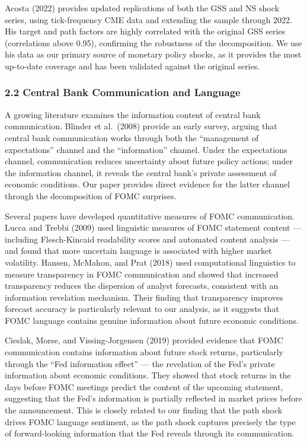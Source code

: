 \documentclass[
]{article}
\begin{document}
Acosta (2022) provides updated replications of both the GSS and NS shock
series, using tick-frequency CME data and extending the sample through
2022. His target and path factors are highly correlated with the
original GSS series (correlations above 0.95), confirming the robustness
of the decomposition. We use his data as our primary source of monetary
policy shocks, as it provides the most up-to-date coverage and has been
validated against the original series.

\subsubsection{2.2 Central Bank Communication and
Language}\label{central-bank-communication-and-language}

A growing literature examines the information content of central bank
communication. Blinder et al.~(2008) provide an early survey, arguing
that central bank communication works through both the ``management of
expectations'' channel and the ``information'' channel. Under the
expectations channel, communication reduces uncertainty about future
policy actions; under the information channel, it reveals the central
bank's private assessment of economic conditions. Our paper provides
direct evidence for the latter channel through the decomposition of FOMC
surprises.

Several papers have developed quantitative measures of FOMC
communication. Lucca and Trebbi (2009) used linguistic measures of FOMC
statement content --- including Flesch-Kincaid readability scores and
automated content analysis --- and found that more uncertain language is
associated with higher market volatility. Hansen, McMahon, and Prat
(2018) used computational linguistics to measure transparency in FOMC
communication and showed that increased transparency reduces the
dispersion of analyst forecasts, consistent with an information
revelation mechanism. Their finding that transparency improves forecast
accuracy is particularly relevant to our analysis, as it suggests that
FOMC language contains genuine information about future economic
conditions.

Cieslak, Morse, and Vissing-Jorgensen (2019) provided evidence that FOMC
communication contains information about future stock returns,
particularly through the ``Fed information effect'' --- the revelation
of the Fed's private information about economic conditions. They showed
that stock returns in the days before FOMC meetings predict the content
of the upcoming statement, suggesting that the Fed's information is
partially reflected in market prices before the announcement. This is
closely related to our finding that the path shock drives FOMC language
sentiment, as the path shock captures precisely the type of
forward-looking information that the Fed reveals through its
communication.
\end{document}
